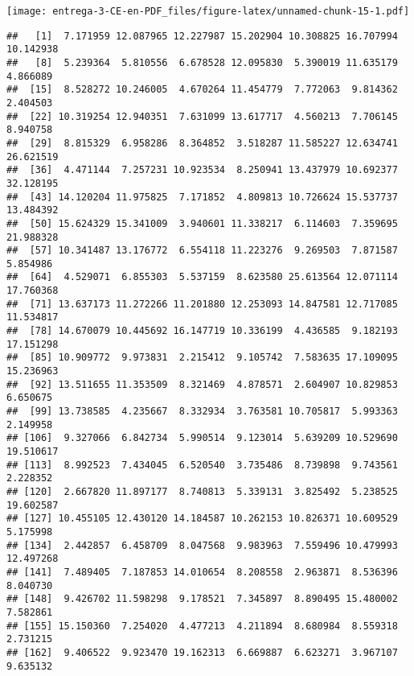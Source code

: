 \documentclass[
]{article}
\newenvironment{Shaded}{\begin{snugshade}}{\end{snugshade}}
\newcommand{\DataTypeTok}[1]{\textcolor[rgb]{0.13,0.29,0.53}{#1}}
\newcommand{\DecValTok}[1]{\textcolor[rgb]{0.00,0.00,0.81}{#1}}
\newcommand{\KeywordTok}[1]{\textcolor[rgb]{0.13,0.29,0.53}{\textbf{#1}}}
\newcommand{\NormalTok}[1]{#1}
\newcommand{\OperatorTok}[1]{\textcolor[rgb]{0.81,0.36,0.00}{\textbf{#1}}}
\newcommand{\StringTok}[1]{\textcolor[rgb]{0.31,0.60,0.02}{#1}}
\begin{document}
\texttt{[image: entrega-3-CE-en-PDF\_files/figure-latex/unnamed-chunk-15-1.pdf]}

\begin{Shaded}
\end{Shaded}

\begin{verbatim}
##   [1]  7.171959 12.087965 12.227987 15.202904 10.308825 16.707994 10.142938
##   [8]  5.239364  5.810556  6.678528 12.095830  5.390019 11.635179  4.866089
##  [15]  8.528272 10.246005  4.670264 11.454779  7.772063  9.814362  2.404503
##  [22] 10.319254 12.940351  7.631099 13.617717  4.560213  7.706145  8.940758
##  [29]  8.815329  6.958286  8.364852  3.518287 11.585227 12.634741 26.621519
##  [36]  4.471144  7.257231 10.923534  8.250941 13.437979 10.692377 32.128195
##  [43] 14.120204 11.975825  7.171852  4.809813 10.726624 15.537737 13.484392
##  [50] 15.624329 15.341009  3.940601 11.338217  6.114603  7.359695 21.988328
##  [57] 10.341487 13.176772  6.554118 11.223276  9.269503  7.871587  5.854986
##  [64]  4.529071  6.855303  5.537159  8.623580 25.613564 12.071114 17.760368
##  [71] 13.637173 11.272266 11.201880 12.253093 14.847581 12.717085 11.534817
##  [78] 14.670079 10.445692 16.147719 10.336199  4.436585  9.182193 17.151298
##  [85] 10.909772  9.973831  2.215412  9.105742  7.583635 17.109095 15.236963
##  [92] 13.511655 11.353509  8.321469  4.878571  2.604907 10.829853  6.650675
##  [99] 13.738585  4.235667  8.332934  3.763581 10.705817  5.993363  2.149958
## [106]  9.327066  6.842734  5.990514  9.123014  5.639209 10.529690 19.510617
## [113]  8.992523  7.434045  6.520540  3.735486  8.739898  9.743561  2.228352
## [120]  2.667820 11.897177  8.740813  5.339131  3.825492  5.238525 19.602587
## [127] 10.455105 12.430120 14.184587 10.262153 10.826371 10.609529  5.175998
## [134]  2.442857  6.458709  8.047568  9.983963  7.559496 10.479993 12.497268
## [141]  7.489405  7.187853 14.010654  8.208558  2.963871  8.536396  8.040730
## [148]  9.426702 11.598298  9.178521  7.345897  8.890495 15.480002  7.582861
## [155] 15.150360  7.254020  4.477213  4.211894  8.680984  8.559318  2.731215
## [162]  9.406522  9.923470 19.162313  6.669887  6.623271  3.967107  9.635132

\end{verbatim}
\end{document}
